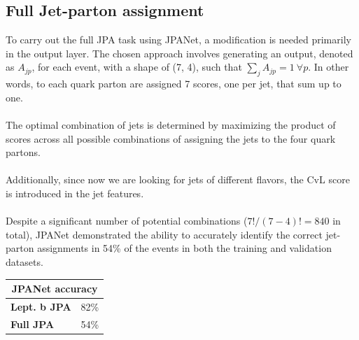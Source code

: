 \subsection{Full Jet-parton assignment}
To carry out the full JPA task using JPANet, a modification is needed primarily in the output layer. The chosen approach involves generating an output, denoted as $A_{jp}$,  for each event, with a shape of (7, 4), such that $\sum_j A_{jp}=1 \: \forall p$.
In other words, to each quark parton are assigned 7 scores, one per jet, that sum up to one.\\
\\
The optimal combination of jets is determined by maximizing the product of scores across all possible combinations of assigning the jets to the four quark partons.\\
\\
Additionally, since now we are looking for jets of different flavors, the \DeepJet CvL score is introduced in the jet features.\\
\\
Despite a significant number of potential combinations ($7!/(7-4)!=840$ in total), JPANet demonstrated the ability to accurately identify the correct jet-parton assignments in 54\% of the events in both the training and validation datasets.


\begin{table}[H]
    \centering
    \begin{tabular}{l|c}
    \toprule
    \multicolumn{2}{c}{\textbf{JPANet accuracy}}\\
    \midrule
         \textbf{Lept. b JPA}& 82\%\\
         \textbf{Full JPA}& 54\%\\
    \end{tabular}
\end{table}